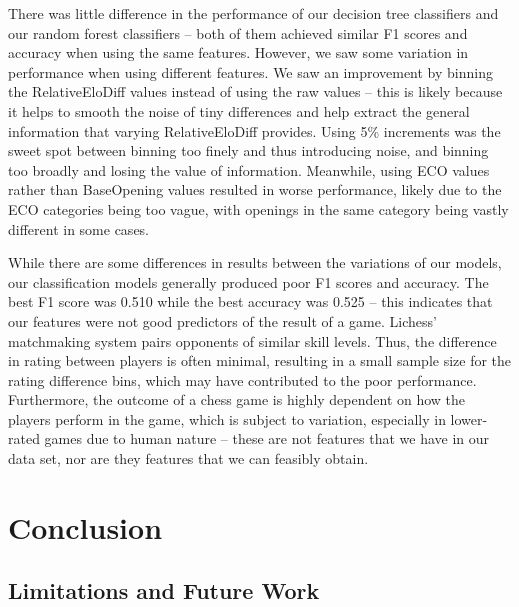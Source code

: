\documentclass[a4paper, 11pt]{article}
\begin{document}
There was little difference in the performance of our decision tree classifiers and our random forest classifiers -- both of them achieved similar F1 scores and accuracy when using the same features. However, we saw some variation in performance when using different features. We saw an improvement by binning the RelativeEloDiff values instead of using the raw values -- this is likely because it helps to smooth the noise of tiny differences and help extract the general information that varying RelativeEloDiff provides. Using 5\% increments was the sweet spot between binning too finely and thus introducing noise, and binning too broadly and losing the value of information. Meanwhile, using ECO values rather than BaseOpening values resulted in worse performance, likely due to the ECO categories being too vague, with openings in the same category being vastly different in some cases.

While there are some differences in results between the variations of our models, our classification models generally produced poor F1 scores and accuracy. The best F1 score was 0.510 while the best accuracy was 0.525 -- this indicates that our features were not good predictors of the result of a game. Lichess' matchmaking system pairs opponents of similar skill levels. Thus, the difference in rating between players is often minimal, resulting in a small sample size for the rating difference bins, which may have contributed to the poor performance. Furthermore, the outcome of a chess game is highly dependent on how the players perform in the game, which is subject to variation, especially in lower-rated games due to human nature -- these are not features that we have in our data set, nor are they features that we can feasibly obtain. 

\section{Conclusion}

\subsection{Limitations and Future Work}



\end{document}
